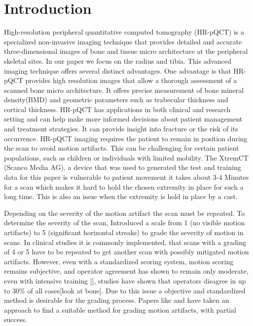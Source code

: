 \documentclass[
a4paper, 
12pt,
grayscalebody, %
abstract=on,
twoside, BCOR10mm, 12pt, DIV13,headinclude, footexclude, final, abstracton, openright
]{ibireprt}
\numberwithin{equation}{chapter}
\numberwithin{table}{chapter}
\numberwithin{figure}{chapter}
\numberwithin{algorithm}{chapter}
\numberwithin{example}{chapter}
\numberwithin{example}{chapter}
\begin{document}
\chapter{Introduction}

High-resolution peripheral quantitative computed tomography (HR-pQCT) is a specialized non-invasive imaging technique that provides detailed and accurate three-dimensional images of bone and tissue micro architecture at the peripheral skeletal sites. In our paper we focus  on the radius and tibia. This advanced imaging technique offers several distinct advantages. One advantage is that HR-pQCT provides high resolution images that allow a thorough assessment of a scanned bone micro architecture. It offers precise measurement of bone mineral density(BMD) and geometric parameters such as trabecular thickness and cortical thickness. HR-pQCT has applications in both clinical and research setting and can help make more informed decisions about patient management and treatment strategies. It can provide insight into fracture or the risk of its occurrence. HR-pQCT imaging requires the patient to remain in position during the scan to avoid motion artifacts. This can be challenging for certain patient populations, such as children or individuals with limited  mobility. The XtremCT (Scanco Media AG), a device that  was used to generated the test and training data for this paper is vulnerable to patient movement it takes about 3-4 Minutes for a scan which makes it hard to hold the chosen extremity in place for such a long time. This is also an issue when the extremity is hold in place by a cast.

 Depending on the severity of the motion artifact the scan must be repeated. To determine the severity of the scan, \cite{Whittier2020} Introduced a scale from 1 (no visible motion artifacts) to 5 (significant horizontal streaks) to grade the severity of motion in scans. In clinical studies it is commonly implemented, that scans with a grading of 4 or 5 have to be repeated to get another scan with possibly mitigated motion artifacts. However, even with a standardized scoring system, motion scoring remains subjective, and operator agreement has shown to remain only moderate, even with intensive training [], studies have shown that operators disagree in up to 30\% of all cases[look at bone]. Due to this issue a objective and standardized method is desirable for the grading process. Papers like \cite{Sode2011} and \cite{Walle2023} have taken an approach to find a suitable method for grading motion artifacts, with partial success.
 
\end{document}
